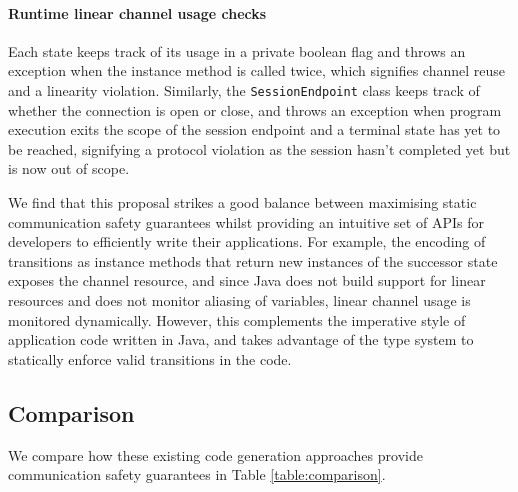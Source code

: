 \paragraph{Runtime linear channel usage checks} Each state keeps track of its usage in a private boolean flag and throws an exception when the instance method is called twice, which signifies channel reuse and a linearity violation. Similarly, the \texttt{SessionEndpoint} class keeps track of whether the connection is open or close, and throws an exception when program execution exits the scope of the session endpoint and a terminal state has yet to be reached, signifying a protocol violation as the session hasn't completed yet but is now out of scope.

We find that this proposal strikes a good balance between maximising static communication safety guarantees whilst providing an intuitive set of APIs for developers to efficiently write their applications. For example, the encoding of transitions as instance methods that return new instances of the successor state exposes the channel resource, and since Java does not build support for linear resources and does not monitor aliasing of variables, linear channel usage is monitored dynamically. However, this complements the imperative style of application code written in Java, and takes advantage of the type system to statically enforce valid transitions in the code.

\subsection{Comparison}
\label{section:codegencompare}

We compare how these existing code generation approaches provide communication safety guarantees in Table \ref{table:comparison}.


